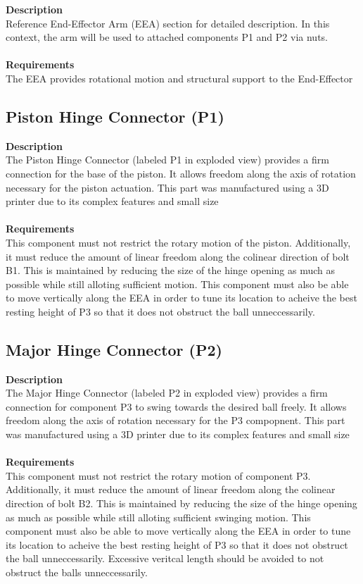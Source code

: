 \documentclass[titlepage]{article}
\begin{document}


\textbf{Description}\\
Reference End-Effector Arm (EEA) section for detailed description. In this context, the arm will be used to attached components P1 and P2 via nuts.\\~\\
\textbf{Requirements}\\
The EEA provides rotational motion and structural support to the End-Effector


\subsection{Piston Hinge Connector (P1)}
\textbf{Description}\\
The Piston Hinge Connector (labeled P1 in exploded view) provides a firm connection for the base of the piston. It allows freedom along the axis of rotation necessary for the piston actuation. This part was manufactured using a 3D printer due to its complex features and small size\\~\\
\textbf{Requirements}\\
This component must not restrict the rotary motion of the piston. Additionally, it must reduce the amount of linear freedom along the colinear direction of bolt B1. This is maintained by reducing the size of the hinge opening as much as possible while still alloting sufficient motion. This component must also be able to move vertically along the EEA in order to tune its location to acheive the best resting height of P3 so that it does not obstruct the ball unneccessarily.

\subsection{Major Hinge Connector (P2)}
\textbf{Description}\\
The Major Hinge Connector (labeled P2 in exploded view) provides a firm connection for component P3 to swing towards the desired ball freely. It allows freedom along the axis of rotation necessary for the P3 compopnent. This part was manufactured using a 3D printer due to its complex features and small size\\~\\
\textbf{Requirements}\\
This component must not restrict the rotary motion of component P3. Additionally, it must reduce the amount of linear freedom along the colinear direction of bolt B2. This is maintained by reducing the size of the hinge opening as much as possible while still alloting sufficient swinging motion. This component must also be able to move vertically along the EEA in order to tune its location to acheive the best resting height of P3 so that it does not obstruct the ball unneccessarily. Excessive veritcal length should be avoided to not obstruct the balls unneccessarily.
\end{document}
